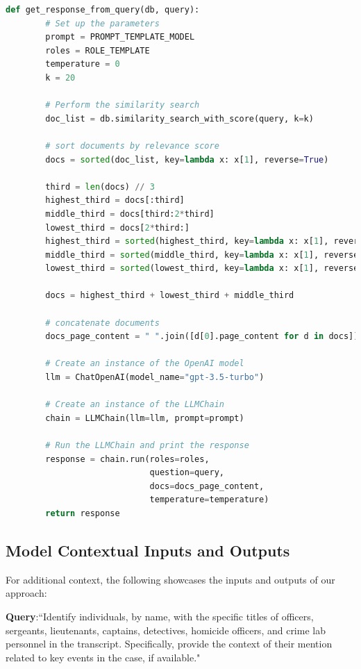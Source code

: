 \documentclass{article}
\begin{document}
\begin{lstlisting}[language=Python, caption=Code Snippet 6, breaklines=true]
    def get_response_from_query(db, query):
        # Set up the parameters
        prompt = PROMPT_TEMPLATE_MODEL
        roles = ROLE_TEMPLATE
        temperature = 0
        k = 20
    
        # Perform the similarity search
        doc_list = db.similarity_search_with_score(query, k=k)

        # sort documents by relevance score 
        docs = sorted(doc_list, key=lambda x: x[1], reverse=True)
        
        third = len(docs) // 3
        highest_third = docs[:third]
        middle_third = docs[third:2*third]
        lowest_third = docs[2*third:]
        highest_third = sorted(highest_third, key=lambda x: x[1], reverse=True)
        middle_third = sorted(middle_third, key=lambda x: x[1], reverse=True)
        lowest_third = sorted(lowest_third, key=lambda x: x[1], reverse=True)
    
        docs = highest_third + lowest_third + middle_third

        # concatenate documents
        docs_page_content = " ".join([d[0].page_content for d in docs])
    
        # Create an instance of the OpenAI model
        llm = ChatOpenAI(model_name="gpt-3.5-turbo")
    
        # Create an instance of the LLMChain
        chain = LLMChain(llm=llm, prompt=prompt)
    
        # Run the LLMChain and print the response
        response = chain.run(roles=roles, 
                             question=query, 
                             docs=docs_page_content, 
                             temperature=temperature)
        return response
\end{lstlisting}

\subsection{Model Contextual Inputs and Outputs}

For additional context, the following showcases the inputs and outputs of our approach:

\vspace{1em} 

\noindent \textbf{Query}:``Identify individuals, by name, with the specific titles of officers, sergeants, lieutenants, captains, detectives, homicide officers, and crime lab personnel in the transcript. Specifically, provide the context of their mention related to key events in the case, if available."
\end{document}
